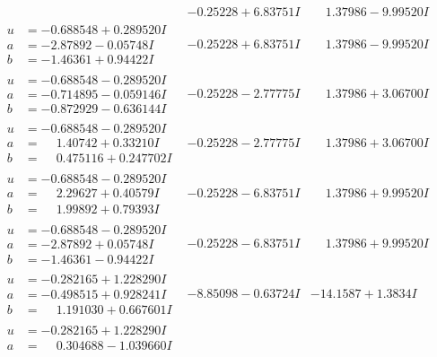 \documentclass[1p]{elsarticle_modified}
\theoremstyle{definition}
\begin{document}
$$\begin{array}{c|c|c}
 & -0.25228 + 6.83751 I & \phantom{-}1.37986 - 9.99520 I \\ \hline\begin{aligned}
u &= -0.688548 + 0.289520 I \\
a &= -2.87892 - 0.05748 I \\
b &= -1.46361 + 0.94422 I\end{aligned}
 & -0.25228 + 6.83751 I & \phantom{-}1.37986 - 9.99520 I \\ \hline\begin{aligned}
u &= -0.688548 - 0.289520 I \\
a &= -0.714895 - 0.059146 I \\
b &= -0.872929 - 0.636144 I\end{aligned}
 & -0.25228 - 2.77775 I & \phantom{-}1.37986 + 3.06700 I \\ \hline\begin{aligned}
u &= -0.688548 - 0.289520 I \\
a &= \phantom{-}1.40742 + 0.33210 I \\
b &= \phantom{-}0.475116 + 0.247702 I\end{aligned}
 & -0.25228 - 2.77775 I & \phantom{-}1.37986 + 3.06700 I \\ \hline\begin{aligned}
u &= -0.688548 - 0.289520 I \\
a &= \phantom{-}2.29627 + 0.40579 I \\
b &= \phantom{-}1.99892 + 0.79393 I\end{aligned}
 & -0.25228 - 6.83751 I & \phantom{-}1.37986 + 9.99520 I \\ \hline\begin{aligned}
u &= -0.688548 - 0.289520 I \\
a &= -2.87892 + 0.05748 I \\
b &= -1.46361 - 0.94422 I\end{aligned}
 & -0.25228 - 6.83751 I & \phantom{-}1.37986 + 9.99520 I \\ \hline\begin{aligned}
u &= -0.282165 + 1.228290 I \\
a &= -0.498515 + 0.928241 I \\
b &= \phantom{-}1.191030 + 0.667601 I\end{aligned}
 & -8.85098 - 0.63724 I & -14.1587 + 1.3834 I \\ \hline\begin{aligned}
u &= -0.282165 + 1.228290 I \\
a &= \phantom{-}0.304688 - 1.039660 I \\

\end{aligned}
\end{array}$$
\end{document}

